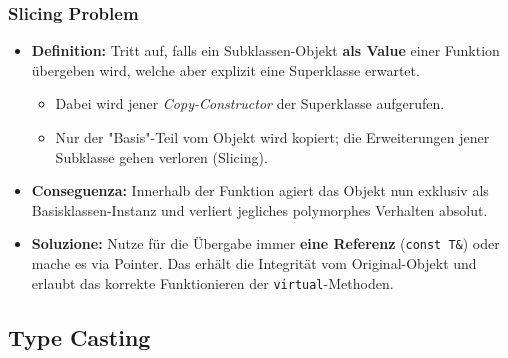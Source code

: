 \subsubsection{Slicing Problem}

\begin{itemize}
    \item \textbf{Definition:} Tritt auf, falls ein Subklassen-Objekt \textbf{als Value} einer Funktion übergeben wird, welche aber explizit eine Superklasse erwartet.
    \begin{itemize}
        \item Dabei wird jener \textit{Copy-Constructor} der Superklasse aufgerufen.
        \item Nur der "Basis"-Teil vom Objekt wird kopiert; die Erweiterungen jener Subklasse gehen verloren (Slicing).
    \end{itemize}
    \item \textbf{Conseguenza:} Innerhalb der Funktion agiert das Objekt nun exklusiv als Basisklassen-Instanz und verliert jegliches polymorphes Verhalten absolut.
    \item \textbf{Soluzione:} Nutze für die Übergabe immer \textbf{eine Referenz} (\texttt{const T\&}) oder mache es via Pointer.
    Das erhält die Integrität vom Original-Objekt und erlaubt das korrekte Funktionieren der \texttt{virtual}-Methoden.
\end{itemize}

\subsection{Type Casting}\vspace{-1em}

